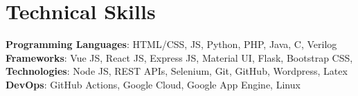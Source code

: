 \section{Technical Skills}
 \begin{itemize}[leftmargin=0.15in, label={}]
    \small{\item{
     \textbf{Programming Languages}{: HTML/CSS, JS, Python, PHP, Java, C, Verilog} \\
     \textbf{Frameworks}{: Vue JS, React JS, Express JS, Material UI, Flask, Bootstrap CSS, } \\
     \textbf{Technologies}{: Node JS, REST APIs, Selenium, Git, GitHub, Wordpress, Latex
} \\
     \textbf{DevOps}{: GitHub Actions, Google Cloud, Google App Engine, Linux}
    }}
 \end{itemize} 